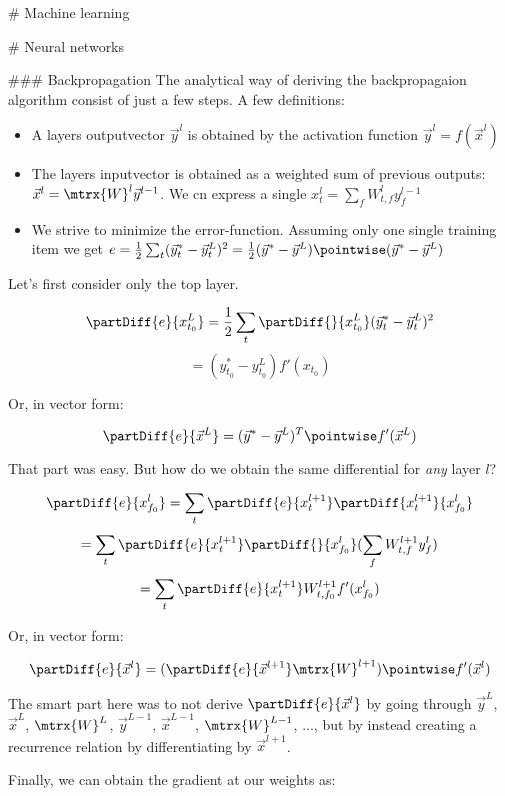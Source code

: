 # Machine learning

# Neural networks

### Backpropagation
The analytical way of deriving the backpropagaion algorithm consist of just a few steps. 
A few definitions: 

\begin{itemize}
	\item A layers outputvector $\vec{y}^l$ is obtained by the activation function $\vec{y}^l = f(\vec{x}^l) $
	\item The layers inputvector is obtained as a weighted sum of previous outputs: $\vec{x}^l = \mtrx{W}^l \vec{y}^{l-1} $. We cn express a single $x_t^l = \sum_f W_{t,f}^l y_f^{l-1}$
	\item We strive to minimize the error-function. Assuming only one single training item we get $e = \frac{1}{2} \sum_t (\vec{y}^*_t - \vec{y}^L_t)^2 = \frac{1}{2} (\vec{y}^* - \vec{y}^L) \pointwise (\vec{y}^* - \vec{y}^L) $
\end{itemize}

Let's first consider only the top layer. 

$$  \partDiff{e}{x_{t_0}^L} = \frac{1}{2} \sum_t \partDiff{}{x_{t_0}^L} (\vec{y}^*_t - \vec{y}^L_t)^2 $$
$$ = (y_{t_0}^* - y_{t_0}^L) f'(x_{t_0}) $$

Or, in vector form: 

$$ \partDiff{e}{\vec{x}^L} = (\vec{y}^* - \vec{y}^L)^T \pointwise f'(\vec{x}^L)  $$


That part was easy. But how do we obtain the same differential for \emph{any} layer $l$?

$$ \partDiff{e}{x_{f_0}^l} = \sum_t \partDiff{e}{x_t^{l+1}} \partDiff{x_t^{l+1}}{x_{f_0}^l}  $$
$$                         = \sum_t \partDiff{e}{x_t^{l+1}} \partDiff{}{x_{f_0}^l} ( \sum_f W_{t,f}^{l+1} y_f^l ) $$
$$                         = \sum_t \partDiff{e}{x_t^{l+1}} W_{t,f_0}^{l+1} f'(x_{f_0}^l)  $$

Or, in vector form: 

$$ \partDiff{e}{\vec{x}^l} = ( \partDiff{e}{\vec{x}^{l+1}} \mtrx{W}^{l+1} ) \pointwise f'(\vec{x}^l)  $$

The smart part here was to not derive $ \partDiff{e}{\vec{x}^l} $ by going through $\vec{y}^L$, $\vec{x}^L$, $\mtrx{W}^L$, $\vec{y}^{L-1}$, $\vec{x}^{L-1}$, $\mtrx{W}^{L-1}$, ..., but by instead creating a recurrence relation by differentiating by $\vec{x}^{l+1}$.

Finally, we can obtain the gradient at our weights as: 

